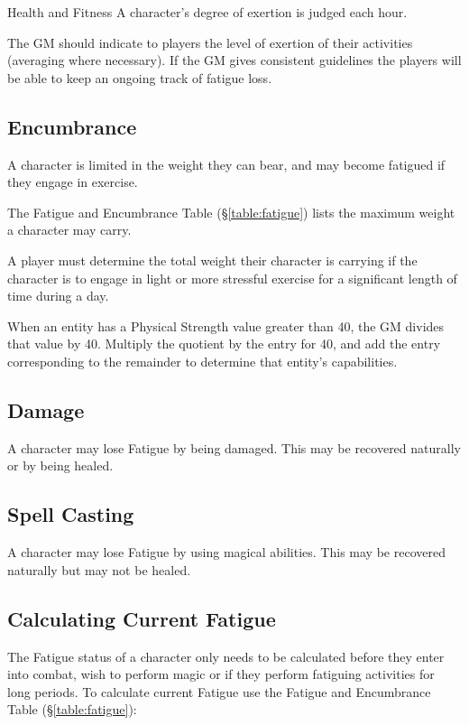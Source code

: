 \begin{Chapter}{Health and Fitness}
A character’s degree of exertion is judged each hour.

The GM should indicate to players the level of exertion of their
activities (averaging where necessary).  If the GM gives consistent
guidelines the players will be able to keep an ongoing track of
fatigue loss.

\subsection{Encumbrance}

A character is limited in the weight they can bear, and may become
fatigued if they engage in exercise.

The Fatigue and Encumbrance Table (\S\ref{table:fatigue}) lists the
maximum weight a character may carry.

A player must determine the total weight their character is carrying
if the character is to engage in light or more stressful exercise for
a significant length of time during a day.

When an entity has a Physical Strength value greater than 40, the GM
divides that value by 40.  Multiply the quotient by the entry for 40,
and add the entry corresponding to the remainder to determine that
entity’s capabilities.

\subsection{Damage}

A character may lose Fatigue by being damaged.  This may be recovered
naturally or by being healed.

\subsection{Spell Casting}

A character may lose Fatigue by using magical abilities. This may be
recovered naturally but may not be healed.

\subsection{Calculating Current Fatigue}

The Fatigue status of a character only needs to be calculated before
they enter into combat, wish to perform magic or if they perform
fatiguing activities for long periods.  To calculate current Fatigue
use the Fatigue and Encumbrance Table (\S\ref{table:fatigue}):


\end{Chapter}

